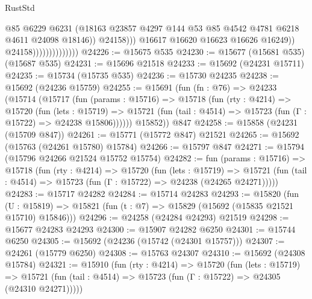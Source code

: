 \begin{lexlean}{RustStd}
\begin{coremodule}
                                            @85
                                            @6229
                                            @6231
                                            (@18163
                                              @23857
                                              @4297
                                              @144
                                              @53
                                              @85
                                              @4542
                                              @4781
                                              @6218
                                              @4611
                                              @24098
                                              @18146))
                                          @24158)))
                                    @16617
                                    @16620
                                    @16623
                                    @16626
                                    @16249))
                                @24158))))))))))))))
@24226 := @15675 @535
@24230 := @15677 (@15681 @535) (@15687 @535)
@24231 := @15696 @21518
@24233 := @15692 (@24231 @15711)
@24235 := @15734 (@15735 @535)
@24236 := @15730 @24235
@24238 := @15692 (@24236 @15759)
@24255 := @15691
    (fun (fn : @76) =>
    @24233
      (@15714
        (@15717
          (fun (params : @15716) =>
          @15718
            (fun (rty : @4214) =>
            @15720
              (fun (lets : @15719) =>
              @15721 (fun (tail : @4514) => @15723 (fun (Γ : @15722) => @24238 @15806))))))
        @15852))
    @847
@24258 := @15858 (@24231 (@15709 @847))
@24261 := @15771 (@15772 @847) @21521
@24265 := @15692 (@15763 (@24261 @15780) @15784)
@24266 := @15797 @847
@24271 := @15794 (@15796 @24266 @21524 @15752 @15754)
@24282 := fun (params : @15716) =>
  @15718
    (fun (rty : @4214) =>
    @15720
      (fun (lets : @15719) =>
      @15721 (fun (tail : @4514) => @15723 (fun (Γ : @15722) => @24238 (@24265 @24271)))))
@24283 := @15717 @24282
@24284 := @15714 @24283
@24293 := @15820
    (fun (U : @15819) => @15821 (fun (t : @7) => @15829 (@15692 (@15835 @21521 @15710) @15846)))
@24296 := @24258 (@24284 @24293) @21519
@24298 := @15677 @24283 @24293
@24300 := @15907 @24282 @6250
@24301 := @15744 @6250
@24305 := @15692 (@24236 (@15742 (@24301 @15757)))
@24307 := @24261 (@15779 @6250)
@24308 := @15763 @24307
@24310 := @15692 (@24308 @15784)
@24321 := @15910
    (fun (rty : @4214) =>
    @15720
      (fun (lets : @15719) =>
      @15721 (fun (tail : @4514) => @15723 (fun (Γ : @15722) => @24305 (@24310 @24271)))))

\end{coremodule}
\end{lexlean}

